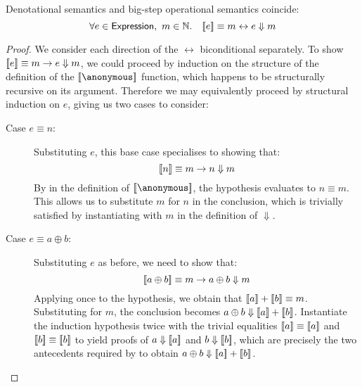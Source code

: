 \begin{theorem}
Denotational semantics and big-step operational semantics coincide:
\[
	\forall e \in \Expression,\ m \in \Nat.\quad
		\sb[e] \equiv m \leftrightarrow e \Downarrow m
\]
\end{theorem}

\begin{proof}
We consider each direction of the $\leftrightarrow$ biconditional
separately. To show $\sb[e] \equiv m \rightarrow e \Downarrow m$, we could
proceed by induction on the structure of the definition of the
$\sb[\anonymous]$ function, which happens to be structurally recursive on
its argument. Therefore we may equivalently proceed by structural induction
on $e$, giving us two cases to consider:
\begin{description}
\item[Case $e \equiv n$:]%
Substituting $e$, this base case specialises to showing that:
\[
	\sb[n] \equiv m \rightarrow n \Downarrow m
\]
By  in the definition of $\sb[\anonymous]$, the
hypothesis evaluates to $n \equiv m$. This allows us to substitute $m$ for
$n$ in the conclusion, which is trivially satisfied by instantiating
 with $m$ in the definition of ${\Downarrow}$.
\item[Case $e \equiv a \oplus b$:]%
Substituting $e$ as before, we need to show that:
\[
	\sb[a \oplus b] \equiv m \rightarrow a \oplus b \Downarrow m
\]
Applying  once to the hypothesis, we obtain that $\sb[a]
+ \sb[b] \equiv m$. Substituting for $m$, the conclusion becomes $a \oplus
b \Downarrow \sb[a] + \sb[b]$. Instantiate the induction hypothesis twice
with the trivial equalities $\sb[a] \equiv \sb[a]$ and $\sb[b] \equiv
\sb[b]$ to yield proofs of $a \Downarrow \sb[a]$ and $b \Downarrow \sb[b]$,
which are precisely the two antecedents required by  to
obtain $a \oplus b \Downarrow \sb[a] + \sb [b]$.
\end{description}


\end{proof}
